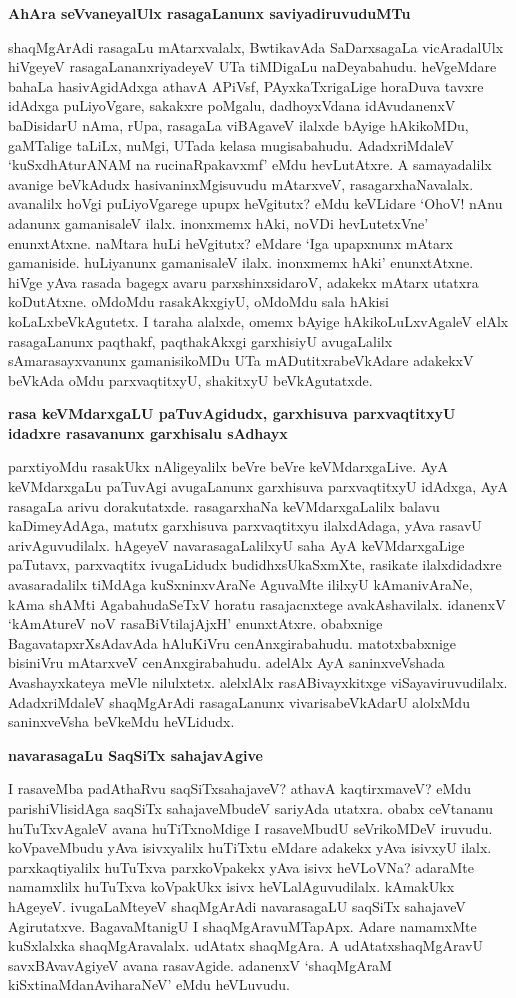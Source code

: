 {\bf AhAra seVvaneyalUlx rasagaLanunx saviyadiruvuduMTu}

shaqMgArAdi rasagaLu mAtarxvalalx, BwtikavAda SaDarxsagaLa vicAradalUlx hiVgeyeV rasagaLananxriyadeyeV UTa tiMDigaLu naDeyabahudu. heVgeMdare bahaLa hasivAgidAdxga athavA APiVsf, PAyxkaTxrigaLige horaDuva tavxre idAdxga puLiyoVgare, sakakxre poMgalu, dadhoyxVdana idAvudanenxV baDisidarU nAma, rUpa, rasagaLa viBAgaveV ilalxde bAyige hAkikoMDu, gaMTalige taLiLx, nuMgi, UTada kelasa mugisabahudu. AdadxriMdaleV `kuSxdhAturANAM na rucinaRpakavxmf' eMdu hevLutAtxre. A samayadalilx avanige beVkAdudx hasivaninxMgisuvudu mAtarxveV, rasagarxhaNavalalx. avanalilx hoVgi puLiyoVgarege upupx heVgitutx? eMdu keVLidare `OhoV! nAnu adanunx gamanisaleV ilalx. inonxmemx hAki, noVDi hevLutetxVne' enunxtAtxne. naMtara huLi heVgitutx? eMdare `Iga upapxnunx mAtarx gamaniside. huLiyanunx gamanisaleV ilalx. inonxmemx hAki' enunxtAtxne. hiVge yAva rasada bagegx avaru parxshinxsidaroV, adakekx mAtarx utatxra koDutAtxne. oMdoMdu rasakAkxgiyU, oMdoMdu sala hAkisi koLaLxbeVkAgutetx. I taraha alalxde, omemx bAyige hAkikoLuLxvAgaleV elAlx rasagaLanunx paqthakf, paqthakAkxgi garxhisiyU avugaLalilx sAmarasayxvanunx gamanisikoMDu UTa mADutitxrabeVkAdare adakekxV beVkAda oMdu parxvaqtitxyU, shakitxyU beVkAgutatxde.

{\bf rasa keVMdarxgaLU paTuvAgidudx, garxhisuva parxvaqtitxyU idadxre rasavanunx garxhisalu sAdhayx}

parxtiyoMdu rasakUkx nAligeyalilx beVre beVre keVMdarxgaLive. AyA keVMdarxgaLu paTuvAgi avugaLanunx garxhisuva parxvaqtitxyU idAdxga, AyA rasagaLa arivu dorakutatxde. rasagarxhaNa keVMdarxgaLalilx balavu kaDimeyAdAga, matutx garxhisuva parxvaqtitxyu ilalxdAdaga, yAva rasavU arivAguvudilalx. hAgeyeV navarasagaLalilxyU saha AyA keVMdarxgaLige paTutavx, parxvaqtitx ivugaLidudx budidhxsUkaSxmXte, rasikate ilalxdidadxre avasaradalilx tiMdAga kuSxninxvAraNe AguvaMte ililxyU kAmanivAraNe, kAma shAMti AgabahudaSeTxV horatu rasajacnxtege avakAshavilalx. idanenxV `kAmAtureV noV rasaBiVtilajAjxH' enunxtAtxre. obabxnige BagavatapxrXsAdavAda hAluKiVru cenAnxgirabahudu. matotxbabxnige bisiniVru mAtarxveV cenAnxgirabahudu. adelAlx AyA saninxveVshada Avashayxkateya meVle nilulxtetx. alelxlAlx rasABivayxkitxge viSayaviruvudilalx. AdadxriMdaleV shaqMgArAdi rasagaLanunx vivarisabeVkAdarU alolxMdu saninxveVsha beVkeMdu heVLidudx.

{\bf navarasagaLu SaqSiTx sahajavAgive}

I rasaveMba padAthaRvu saqSiTxsahajaveV? athavA kaqtirxmaveV? eMdu parishiVlisidAga saqSiTx sahajaveMbudeV sariyAda utatxra. obabx ceVtananu huTuTxvAgaleV avana huTiTxnoMdige I rasaveMbudU seVrikoMDeV iruvudu. koVpaveMbudu yAva isivxyalilx huTiTxtu eMdare adakekx yAva isivxyU ilalx. parxkaqtiyalilx huTuTxva parxkoVpakekx yAva isivx heVLoVNa? adaraMte namamxlilx huTuTxva koVpakUkx isivx heVLalAguvudilalx. kAmakUkx hAgeyeV. ivugaLaMteyeV shaqMgArAdi navarasagaLU saqSiTx sahajaveV Agirutatxve. BagavaMtanigU I shaqMgAravuMTapApx. Adare namamxMte kuSxlalxka shaqMgAravalalx. udAtatx shaqMgAra. A udAtatxshaqMgAravU savxBAvavAgiyeV avana rasavAgide. adanenxV `shaqMgAraM kiSxtinaMdanAviharaNeV' eMdu heVLuvudu.

